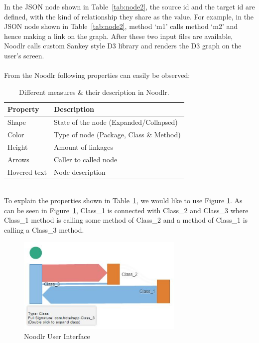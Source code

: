 In the JSON node shown in Table~\ref{tab:node2}, the source id and the target id are defined, with the kind of relationship they share as the value. For example, in the JSON node shown in Table~\ref{tab:node2}, method `m1' calls method `m2' and hence making a link on the graph. After these two input files are available, Noodlr calls custom Sankey style D3 library and renders the D3 graph on the user's screen.\\\\
From the Noodlr following properties can easily be observed:


\begin{table}[h]
\centering
\begin{tabular}{ll}
\hline
Property & Description\\
\hline
Shape & State of the node (Expanded/Collapsed)\\
Color & Type of node (Package, Class \& Method)\\
Height & Amount of linkages\\
Arrows & Caller to called node\\
Hovered text & Node description\\
\hline
\end{tabular}
\caption{Different measures \& their description in Noodlr.}
\label{tab:prop1}
\end{table}\\

To explain the properties shown in Table~\ref{tab:prop1}, we would like to use Figure \ref{fig:noodlr_ui}. As can be seen in Figure~\ref{fig:noodlr_ui}, Class\_1 is connected with Class\_2 and Class\_3 where Class\_1 method is calling some method of Class\_2 and a method of Class\_1 is calling a Class\_3 method. 

\begin{figure}[h!]
\includegraphics[width=8cm]{measures}
\caption{Noodlr User Interface}
\label{fig:noodlr_ui}
\end{figure}

